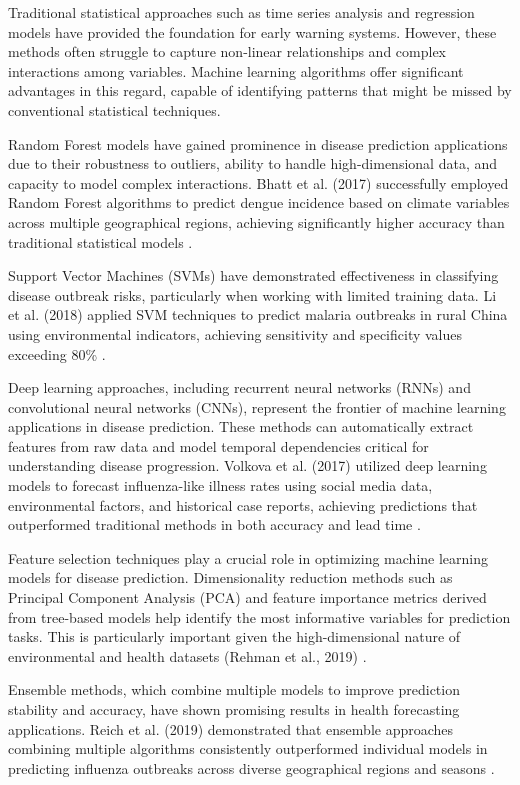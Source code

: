 \documentclass[12pt,a4paper]{report}
\begin{document}
Traditional statistical approaches such as time series analysis and regression models have provided the foundation for early warning systems. However, these methods often struggle to capture non-linear relationships and complex interactions among variables. Machine learning algorithms offer significant advantages in this regard, capable of identifying patterns that might be missed by conventional statistical techniques.

Random Forest models have gained prominence in disease prediction applications due to their robustness to outliers, ability to handle high-dimensional data, and capacity to model complex interactions. Bhatt et al. (2017) successfully employed Random Forest algorithms to predict dengue incidence based on climate variables across multiple geographical regions, achieving significantly higher accuracy than traditional statistical models \cite{bhatt2017global}.

Support Vector Machines (SVMs) have demonstrated effectiveness in classifying disease outbreak risks, particularly when working with limited training data. Li et al. (2018) applied SVM techniques to predict malaria outbreaks in rural China using environmental indicators, achieving sensitivity and specificity values exceeding 80\% \cite{li2018application}.

Deep learning approaches, including recurrent neural networks (RNNs) and convolutional neural networks (CNNs), represent the frontier of machine learning applications in disease prediction. These methods can automatically extract features from raw data and model temporal dependencies critical for understanding disease progression. Volkova et al. (2017) utilized deep learning models to forecast influenza-like illness rates using social media data, environmental factors, and historical case reports, achieving predictions that outperformed traditional methods in both accuracy and lead time \cite{volkova2017forecasting}.

Feature selection techniques play a crucial role in optimizing machine learning models for disease prediction. Dimensionality reduction methods such as Principal Component Analysis (PCA) and feature importance metrics derived from tree-based models help identify the most informative variables for prediction tasks. This is particularly important given the high-dimensional nature of environmental and health datasets (Rehman et al., 2019) \cite{rehman2019feature}.

Ensemble methods, which combine multiple models to improve prediction stability and accuracy, have shown promising results in health forecasting applications. Reich et al. (2019) demonstrated that ensemble approaches combining multiple algorithms consistently outperformed individual models in predicting influenza outbreaks across diverse geographical regions and seasons \cite{reich2019accuracy}.
\end{document}

